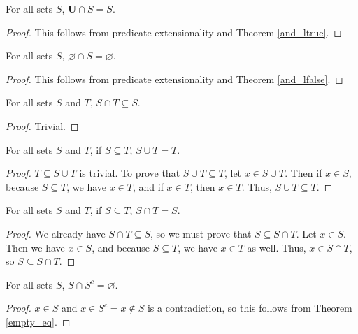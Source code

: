 \documentclass[../../math.tex]{subfiles}
\begin{document}
\begin{theorem} \label{inter_lid}
    For all sets $S$, $\bm U \cap S = S$.
\end{theorem}
\begin{proof}
    This follows from predicate extensionality and Theorem \ref{and_ltrue}.
\end{proof}

\begin{theorem} \label{inter_lanni}
    For all sets $S$, $\varnothing \cap S = \varnothing$.
\end{theorem}
\begin{proof}
    This follows from predicate extensionality and Theorem \ref{and_lfalse}.
\end{proof}

\begin{theorem} \label{inter_lsub}
    For all sets $S$ and $T$, $S \cap T \subseteq S$.
\end{theorem}
\begin{proof}
    Trivial.
\end{proof}

\begin{theorem} \label{lsub_union_equal}
    For all sets $S$ and $T$, if $S \subseteq T$, $S \cup T = T$.
\end{theorem}
\begin{proof}
    $T \subseteq S \cup T$ is trivial.  To prove that $S \cup T \subseteq T$,
    let $x \in S \cup T$.  Then if $x \in S$, because $S \subseteq T$, we have
    $x \in T$, and if $x \in T$, then $x \in T$.  Thus, $S \cup T \subseteq T$.
\end{proof}

\begin{theorem} \label{lsub_inter_equal}
    For all sets $S$ and $T$, if $S \subseteq T$, $S \cap T = S$.
\end{theorem}
\begin{proof}
    We already have $S \cap T \subseteq S$, so we must prove that $S \subseteq S
    \cap T$.  Let $x \in S$.  Then we have $x \in S$, and because $S \subseteq
    T$, we have $x \in T$ as well.  Thus, $x \in S \cap T$, so $S \subseteq S
    \cap T$.
\end{proof}

\begin{theorem} \label{inter_compl_empty}
    For all sets $S$, $S \cap S^c = \varnothing$.
\end{theorem}
\begin{proof}
    $x \in S$ and $x \in S^c = x \notin S$ is a contradiction, so this follows
    from Theorem \ref{empty_eq}.
\end{proof}
\end{document}
